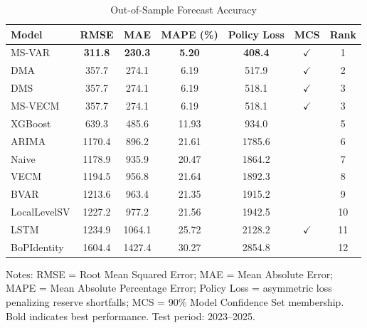 \begin{table}[htbp]
\centering
\small
\caption{Out-of-Sample Forecast Accuracy}
\label{tab:accuracy}
\begin{tabular}{lcccccc}
\toprule
Model & RMSE & MAE & MAPE (\%) & Policy Loss & MCS & Rank \\
\midrule
MS-VAR & \textbf{311.8} & \textbf{230.3} & \textbf{5.20} & \textbf{408.4} & $\checkmark$ & 1 \\
DMA & 357.7 & 274.1 & 6.19 & 517.9 & $\checkmark$ & 2 \\
DMS & 357.7 & 274.1 & 6.19 & 518.1 & $\checkmark$ & 3 \\
MS-VECM & 357.7 & 274.1 & 6.19 & 518.1 & $\checkmark$ & 3 \\
XGBoost & 639.3 & 485.6 & 11.93 & 934.0 &  & 5 \\
ARIMA & 1170.4 & 896.2 & 21.61 & 1785.6 &  & 6 \\
Naive & 1178.9 & 935.9 & 20.47 & 1864.2 &  & 7 \\
VECM & 1194.5 & 956.8 & 21.64 & 1892.3 &  & 8 \\
BVAR & 1213.6 & 963.4 & 21.35 & 1915.2 &  & 9 \\
LocalLevelSV & 1227.2 & 977.2 & 21.56 & 1942.5 &  & 10 \\
LSTM & 1234.9 & 1064.1 & 25.72 & 2128.2 & $\checkmark$ & 11 \\
BoPIdentity & 1604.4 & 1427.4 & 30.27 & 2854.8 &  & 12 \\
\bottomrule
\end{tabular}
\begin{tablenotes}
\small
\item Notes: RMSE = Root Mean Squared Error; MAE = Mean Absolute Error; 
MAPE = Mean Absolute Percentage Error; Policy Loss = asymmetric loss penalizing reserve shortfalls; 
MCS = 90\% Model Confidence Set membership. 
Bold indicates best performance. Test period: 2023--2025.
\end{tablenotes}
\end{table}